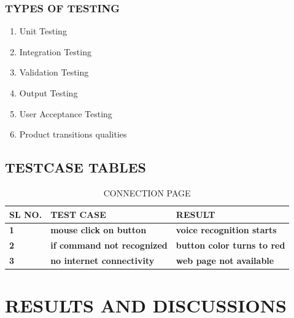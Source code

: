\documentclass[12pt]{report} %
\begin{document}
\subsection{TYPES OF TESTING}
\label{subsec:TYPES OF TESTING}

\begin{enumerate}
	\item Unit Testing 
	\item Integration Testing
	\item Validation Testing 
	\item Output Testing 
	\item User Acceptance Testing 
	\item Product transitions qualities 
\end{enumerate}

\section{TESTCASE TABLES}
\label{sec:TESTCASE TABLES}

\begin{table}[h]
	\centering
	\caption{CONNECTION PAGE}
	\label{tab:CONNECTION PAGE}
	\begin{tabular}{|l|l|l|}
		\hline
		\textbf{SL NO.} & \textbf{TEST CASE} & \textbf{RESULT} \\ \hline
		\textbf{1}      & \textbf{mouse click on button}          & \textbf{voice recognition starts}       \\ \hline
		\textbf{2}      & \textbf{if command not recognized}          & \textbf{button color turns to red}       \\ \hline
		\textbf{3}      & \textbf{no internet connectivity}          & \textbf{web page not available}       \\ \hline
	\end{tabular}
\end{table}


\chapter{RESULTS AND DISCUSSIONS}
\end{document}
